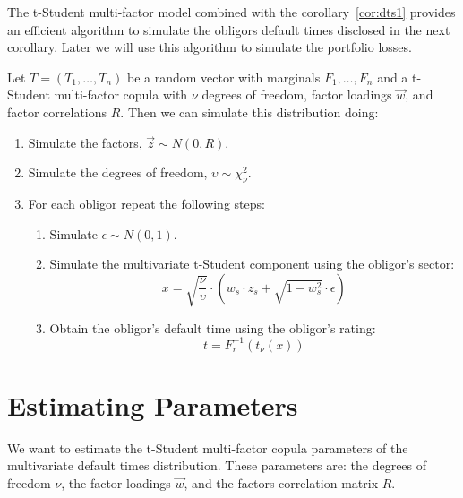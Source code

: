 \documentclass[11pt,fleqn]{book} %
\begin{document}
The t-Student multi-factor model combined with the corollary~\ref{cor:dts1} 
provides an efficient algorithm to simulate the obligors default times 
disclosed in the next corollary. Later we will use this algorithm to simulate
the portfolio losses.

\begin{corollary}
	\label{cor:dts2}
	Let $T=(T_1, \dots, T_n)$ be a random vector with marginals 
	$F_1, \dots, F_n$ and a t-Student multi-factor copula with 
	$\nu$ degrees of freedom, factor loadings $\vec{w}$, and factor correlations 
	$R$. Then we can simulate this distribution doing:
	\begin{enumerate}
		\item Simulate the factors, $\vec{z} \sim N(0,R)$.
		\item Simulate the degrees of freedom, $\upsilon \sim \chi_{\nu}^2$.
		\item For each obligor repeat the following steps:
		\begin{enumerate}
			\item Simulate $\epsilon \sim N(0,1)$.
			\item Simulate the multivariate t-Student component using the obligor's sector:
			\begin{displaymath}
				x = \sqrt{\frac{\nu}{\upsilon}} \cdot \left( w_s \cdot z_s + \sqrt{1-w_s^2} \cdot \epsilon \right)
			\end{displaymath}
			\item Obtain the obligor's default time using the obligor's rating:
			\begin{displaymath}
				t = F_r^{-1}\left(t_{\nu}(x)\right)
			\end{displaymath}
		\end{enumerate}
	\end{enumerate}
\end{corollary}


\chapter{Estimating Parameters}
\label{chap:estimation}

We want to estimate the t-Student multi-factor copula parameters of the 
multivariate default times distribution. These parameters are: the degrees of 
freedom $\nu$, the factor loadings $\vec{w}$, and the factors correlation 
matrix $R$.
\end{document}
